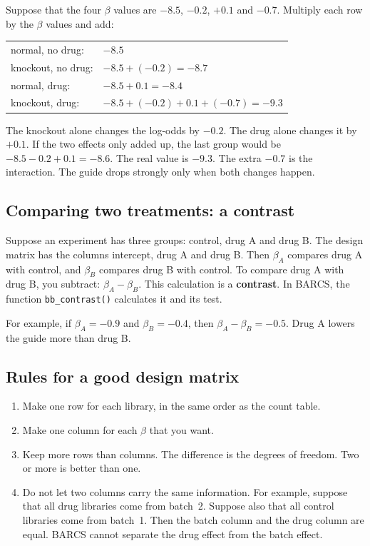 \documentclass[12pt]{article}
\begin{document}
\begin{worked}
Suppose that the four $\beta$ values are $-8.5$, $-0.2$, $+0.1$ and
$-0.7$. Multiply each row by the $\beta$ values and add:

\begin{tabular}{@{}ll@{}}
normal, no drug: & $-8.5$\\
knockout, no drug: & $-8.5 + (-0.2) = -8.7$\\
normal, drug: & $-8.5 + 0.1 = -8.4$\\
knockout, drug: & $-8.5 + (-0.2) + 0.1 + (-0.7) = -9.3$\\
\end{tabular}

\smallskip
The knockout alone changes the log-odds by $-0.2$. The drug alone changes it
by $+0.1$. If the two effects only added up, the last group would be
$-8.5 - 0.2 + 0.1 = -8.6$. The real value is $-9.3$. The extra $-0.7$ is the
interaction. The guide drops strongly only when both changes happen.
\end{worked}

\subsection{Comparing two treatments: a contrast}

Suppose an experiment has three groups: control, drug A and drug B. The
design matrix has the columns intercept, drug A and drug B. Then $\beta_A$
compares drug A with control, and $\beta_B$ compares drug B with control. To
compare drug A with drug B, you subtract: $\beta_A - \beta_B$. This
calculation is a \textbf{contrast}. In BARCS, the function
\texttt{bb\_contrast()} calculates it and its test.

For example, if $\beta_A = -0.9$ and $\beta_B = -0.4$, then
$\beta_A - \beta_B = -0.5$. Drug A lowers the guide more than drug B.

\subsection{Rules for a good design matrix}

\begin{enumerate}
\item Make one row for each library, in the same order as the count table.
\item Make one column for each $\beta$ that you want.
\item Keep more rows than columns. The difference is the degrees of
  freedom. Two or more is better than one.
\item Do not let two columns carry the same information. For example,
  suppose that all drug libraries come from batch~2. Suppose also that all
  control libraries come from batch~1. Then the batch column and the drug
  column are equal. BARCS cannot separate the drug effect from the batch
  effect.
\end{enumerate}
\end{document}
